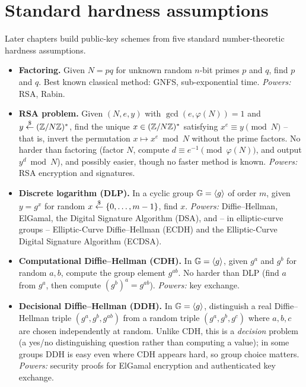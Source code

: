 \section{Standard hardness assumptions}
\label{ch08:landscape}

Later chapters build public-key schemes from five standard number-theoretic hardness assumptions.

\begin{definition}
\label{ch08:def-assumptions}
\leavevmode
\begin{itemize}
\item \textbf{Factoring.} Given $N=pq$ for unknown random $n$-bit primes $p$ and $q$, find $p$ and $q$. Best known classical method: GNFS, sub-exponential time. \emph{Powers:} RSA, Rabin.
\item \textbf{RSA problem.} Given $(N,e,y)$ with $\gcd(e, \varphi(N)) = 1$ and $y \stackrel{\$}{\gets} (\mathbb{Z}/N\mathbb{Z})^{*}$, find the unique $x \in (\mathbb{Z}/N\mathbb{Z})^{*}$ satisfying $x^{e}\equiv y \pmod N$ -- that is, invert the permutation $x \mapsto x^e \bmod N$ without the prime factors. No harder than factoring (factor $N$, compute $d \equiv e^{-1} \pmod{\varphi(N)}$, and output $y^d \bmod N$), and possibly easier, though no faster method is known. \emph{Powers:} RSA encryption and signatures.
\item \textbf{Discrete logarithm (DLP).} In a cyclic group $\mathbb{G}=\langle g\rangle$ of order $m$, given $y=g^{x}$ for random $x \stackrel{\$}{\gets} \{0,\dots,m-1\}$, find $x$. \emph{Powers:} Diffie--Hellman, ElGamal, the Digital Signature Algorithm (DSA), and -- in elliptic-curve groups -- Elliptic-Curve Diffie--Hellman (ECDH) and the Elliptic-Curve Digital Signature Algorithm (ECDSA).
\item \textbf{Computational Diffie--Hellman (CDH).} In $\mathbb{G} = \langle g \rangle$, given $g^{a}$ and $g^{b}$ for random $a, b$, compute the group element $g^{ab}$. No harder than DLP (find $a$ from $g^a$, then compute $(g^b)^a = g^{ab}$). \emph{Powers:} key exchange.
\item \textbf{Decisional Diffie--Hellman (DDH).} In $\mathbb{G} = \langle g \rangle$, distinguish a real Diffie--Hellman triple $(g^a, g^b, g^{ab})$ from a random triple $(g^a, g^b, g^c)$ where $a, b, c$ are chosen independently at random. Unlike CDH, this is a \emph{decision} problem (a yes/no distinguishing question rather than computing a value); in some groups DDH is easy even where CDH appears hard, so group choice matters. \emph{Powers:} security proofs for ElGamal encryption and authenticated key exchange.
\end{itemize}
\end{definition}

